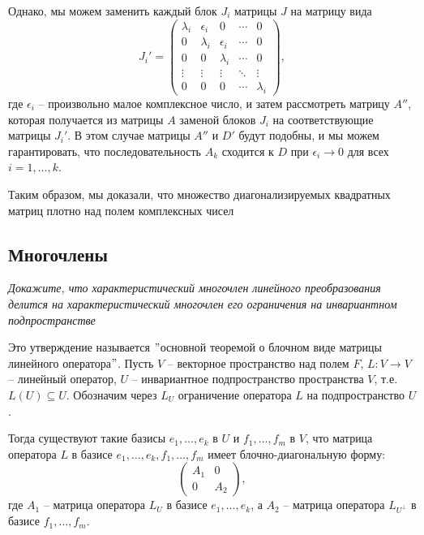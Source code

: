 Однако, мы можем заменить каждый блок $J_i$ матрицы $J$ на матрицу вида
\[
    J_i' = \begin{pmatrix}
               \lambda_i & \epsilon_i & 0          & \cdots & 0         \\
               0         & \lambda_i  & \epsilon_i & \cdots & 0         \\
               0         & 0          & \lambda_i  & \cdots & 0         \\
               \vdots    & \vdots     & \vdots     & \ddots & \vdots    \\
               0         & 0          & 0          & \cdots & \lambda_i
    \end{pmatrix},
\]
где $\epsilon_i$ -- произвольно малое комплексное число, и затем рассмотреть матрицу $A''$, которая получается из
матрицы $A$ заменой блоков $J_i$ на соответствующие матрицы $J_i'$.
В этом случае матрицы $A''$ и $D'$ будут подобны, и мы можем гарантировать, что последовательность $A_k$ сходится
к $D$ при $\epsilon_i \to 0$ для всех $i = 1, \ldots, k$.

Таким образом, мы доказали, что множество диагонализируемых квадратных матриц плотно над полем комплексных чисел


 \subsection*{Многочлены}
\textit{Докажите, что характеристический многочлен линейного преобразования делится на характеристический
многочлен его ограничения на инвариантном подпространстве}

Это утверждение называется \("\)основной теоремой о блочном виде матрицы линейного оператора\("\).
Пусть $V$ -- векторное пространство над полем $F$, $L: V \rightarrow V$ -- линейный оператор, $U$ -- инвариантное
подпространство пространства $V$, т.е. $L(U) \subseteq U$.
Обозначим через $L_U$ ограничение оператора $L$ на подпространство $U$.

Тогда существуют такие базисы $e_1, \ldots, e_k$ в $U$ и $f_1, \ldots, f_m$ в $V$, что матрица оператора $L$ в
базисе $e_1, \ldots, e_k, f_1, \ldots, f_m$ имеет блочно-диагональную форму:
\[
    \begin{pmatrix}
        A_1 & 0   \\
        0   & A_2
    \end{pmatrix},
\]
где $A_1$ -- матрица оператора $L_U$ в базисе $e_1, \ldots, e_k$, а $A_2$ -- матрица оператора $L_{U^\perp}$ в
базисе $f_1, \ldots, f_m$.

